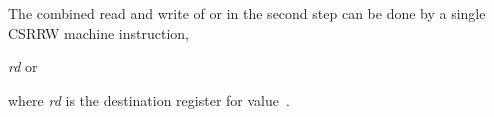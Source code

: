 The combined read and write of  or  in the second
step can be done by a single CSRRW machine instruction,
\begin{displayLinesTable}
\textit{rd}\z{,}  or   \\
\end{displayLinesTable}
where \textit{rd} is the destination register for value~.

